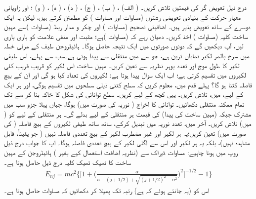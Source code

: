 درج ذیل تعویض گر  کی قیمتیں تلاش کریں۔
 ( الف) ، ( ب) ،
 ( ج) ، ( د) ،
 ( ه) ، ( و) ؛
   اور  زاویائی معیار حرکت کے بنیادی   تعویضی رشتوں (مساوات  اور مساوات ) کو مطمئن کرتے ہیں، لیکن یہ ایک دوسرے کے ساتھ تعویض پذیر ہیں۔ 
اضافیتی تصحیح (مساوات ) اور چکر و مدار ربط (مساوات )سے مہین ساخت کلیہ (مساوات ) اخذ کریں۔  دھیان رہے کہ  (مساوات )ہے؛ مثبت اور منفی علامت کو باری باری لیں، آپ دیکھیں گے کہ دونوں صورتوں میں ایک  نتیجہ حاصل ہوگا۔ 
 ہائیڈروجن طیف کے مرئی خطہ میں سرخ بالمر لکیر نمایاں ترین ہے، جو  سے  میں منتقلی سے پیدا ہوتی ہے۔سب سے پہلے، اس طیفی لکیر کا طول موج اور تعدد بوہر نظریہ سے تعین کریں۔ مہین ساخت اس لکیر کو قریب قریب کئی لکیروں میں تقسیم کرتی ہے؛ اب ایک سوال پیدا ہوتا ہے: لکیروں کی تعداد کیا ہو گی اور ان کے بیچ فاصلہ کتنا ہو گا؟  پہلے قدم میں، معلوم کریں کہ  سطح کتنی ذیلی سطحوں میں تقسیم ہوگی، اور ہر ایک کے لیے،  میں،  تلاش کریں۔ یہی کچھ  کے لیے کریں۔ سطح توانائی کی شکل کا خاکہ بنا کر  سے  تک تمام ممکنہ منتقلی دکھائیں۔ توانائی کا اخراج ( نوریہ کی صورت میں)  ہوگا، جہاں پہلا جزو سب میں مشترک جبکہ (مہین ساخت کی پیدا)  کی قیمت ہر منتقلی کے لیے بدلے گی۔ ہر منتقلی کے لیے  کو (  میں) تلاش کریں۔ آخر میں، تعدد نوریہ میں تبدیل کرکے، ساتھ ساتھ طیفی لکیروں کے بیچ فاصلہ ( کی صورت میں) تعین کریں؛یہ ہر لکیر اور غیر مضطرب لکیر کے بیچ تعددی فاصلہ نہیں ( جو یقیناً، قابل مشاہدہ نہیں)، بلکہ یہ ہر لکیر اور اس سے اگلی لکیر کے بیچ تعددی فاصلہ ہوگا۔ آپ کا جواب درج ذیل روپ میں ہونا چاہیے: 
مساوات ڈیراک سے (نظریہ اضافت استعمال کیے بغیر ) ہائیڈروجن کے مہین ساخت کا ٹھیک ٹھیک کلیہ درج ذیل حاصل ہوتا ہے۔
\begin{align*}
E_{nj} = mc^2 \Big \{ \big [ 1 + \big ( \frac{\alpha}{n - (j + 1/2 ) + \sqrt{(j +1/2)^2 - \alpha^2}} \big )^2 \big ]^{- 1/2} -1 \Big \}
\end{align*}
 اس کو (یہ جانتے ہوئے کہ  ہے)  رتبہ تک پھیلا کر دکھائیں کہ مساوات  حاصل ہوتا ہے۔ 


